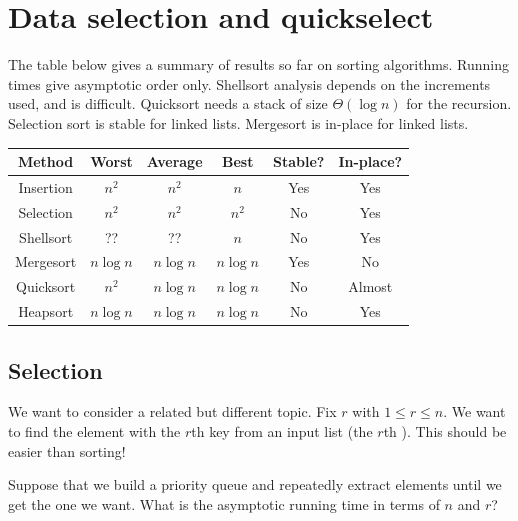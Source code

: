 

\chapter{Data selection and quickselect} %
\label{sec:qselect}

The table below gives a summary of results so far on sorting algorithms.
Running times give asymptotic order only. 
Shellsort analysis depends on the increments used, and is difficult. 
Quicksort needs a stack of size $\Theta(\log n)$ for the recursion. 
Selection sort is stable for linked lists. 
Mergesort is in-place for linked lists.

\begin{center}
\begin{tabular}{|c|c|c|c|c|c|} \hline 
Method & Worst & Average & Best & Stable? & In-place? \\
\hline
Insertion & $n^2$ & $n^2$ & $n$ & Yes & Yes \\
Selection & $n^2$ & $n^2$ & $n^2$ & No & Yes \\
Shellsort & ?? & ?? & $n$ & No & Yes \\
Mergesort & $n \log n$ & $n \log n$ & $n \log n$ & Yes & No \\
Quicksort & $n^2$ & $n \log n$ & $n \log n$ & No & Almost \\
Heapsort & $n \log n$ & $n \log n$ & $n \log n$ & No & Yes \\
\hline
\end{tabular}
\end{center}


\section{Selection}
We want to consider a related but different topic. Fix $r$ with $1\leq r \leq n$. 
We want to find the element with the $r$th key from an input list (the $r$th ). 
This should be easier than sorting! 

\begin{Boxample}[5]
Suppose that we build a priority queue and repeatedly extract elements until we get the one we want.
What is the asymptotic running time in terms of $n$ and $r$?

\end{Boxample}


